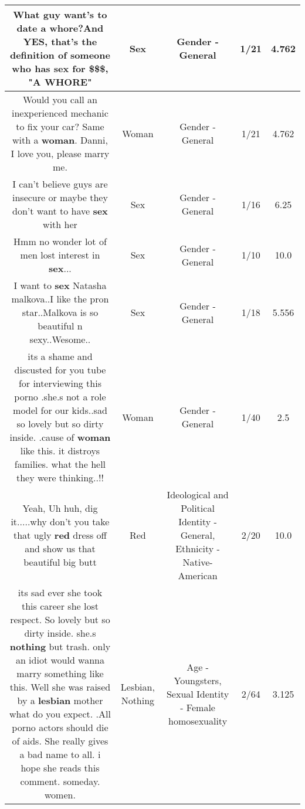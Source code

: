 \documentclass[11pt]{article}
\newlength\mylength
\begin{document}
\begin{center}
\begin{longtable}{|C{.65\mylength}|C{.30\mylength}|C{.12\mylength}|C{.12\mylength}|C{.12\mylength}|}
  \small What guy want's to date a whore?And YES, that's the definition of someone who has \textbf{sex} for \$\$\$, "A WHORE"\normalsize   & Sex & Gender - General & 1/21 & 4.762 \\  \hline
  \small Would you call an inexperienced mechanic to fix your car? Same with a \textbf{woman}.  Danni, I love you, please marry me.\normalsize   & Woman & Gender - General & 1/21 & 4.762 \\  \hline
  \small I can't believe guys are insecure or maybe they don't want to have \textbf{sex} with her\normalsize   & Sex & Gender - General & 1/16 & 6.25 \\  \hline
  \small Hmm no wonder lot of men lost interest in \textbf{sex}...\normalsize   & Sex & Gender - General & 1/10 & 10.0 \\  \hline
  \small I want to \textbf{sex} Natasha malkova..I like the pron star..Malkova is so beautiful n sexy..Wesome..\normalsize   & Sex & Gender - General & 1/18 & 5.556 \\  \hline
  \small its a shame and discusted for you tube for interviewing this porno .she.s not a role model for our kids..sad so lovely but so dirty inside. .cause of \textbf{woman} like this. it distroys families. what the hell they were thinking..!!\normalsize   & Woman & Gender - General & 1/40 & 2.5 \\  \hline
  \small Yeah, Uh huh, dig it.....why don't you take that ugly \textbf{r\textbf{ed}} dress off and show us that beautiful big butt\normalsize   & Red &  Ideological and Political Identity - General, Ethnicity - Native-American & 2/20 & 10.0 \\  \hline
  \small its sad ever she took this career she lost respect. So lovely but so dirty inside. she.s \textbf{nothing} but trash. only an idiot would wanna marry something like this. Well she was raised by a \textbf{lesbian} mother what do you expect. .All porno actors should die of aids. She really gives a bad name to all. i hope she reads this comment. someday. women.\normalsize   & Lesbian, Nothing & Age - Youngsters, Sexual Identity - Female homosexuality & 2/64 & 3.125 \\  \hline

\end{longtable}
\end{center}
\end{document}
